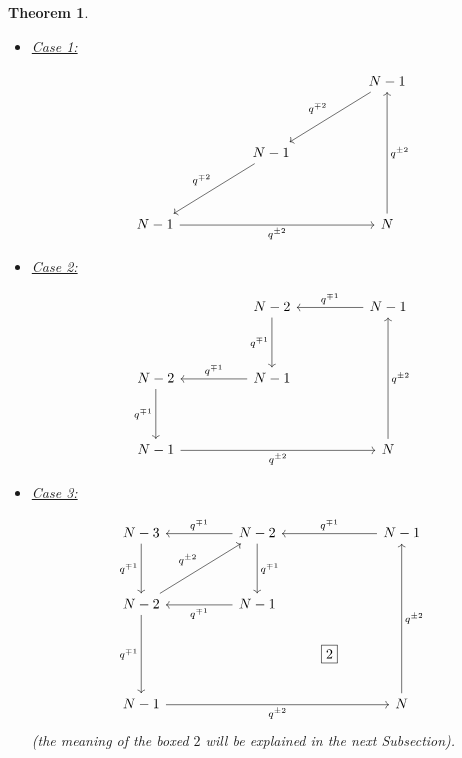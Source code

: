 \documentclass{amsart}
\newtheorem{theorem}[subsection]{Theorem}
\begin{document}
\begin{theorem}
\medskip 

\begin{itemize}[leftmargin=*]

\item \underline{Case 1:} 

\begin{equation}
\label{eqn:wheel c 1}
\begin{tikzcd}
&&&& N-1 \\ \\
&& N-1 \\ &&&  \\
N-1 &&&& N
\arrow["{q^{\pm 2}}"', from=5-1, to=5-5]
\arrow["{q^{\pm 2}}"', from=5-5, to=1-5]
\arrow["{q^{\mp 2}}"', from=1-5, to=3-3]
\arrow["{q^{\mp 2}}"', from=3-3, to=5-1]
\end{tikzcd}
\end{equation}

\medskip 

\item \underline{Case 2:} 

\begin{equation}
\label{eqn:wheel c 2}
\begin{tikzcd}
&& N-2 && N-1 \\ \\
N-2 && N-1 \\ &&&  \\
N-1 &&&& N
\arrow["{q^{\pm 2}}"', from=5-1, to=5-5]
\arrow["{q^{\pm 2}}"', from=5-5, to=1-5]
\arrow["{q^{\mp 1}}"', from=1-5, to=1-3]
\arrow["{q^{\mp 1}}"', from=1-3, to=3-3]
\arrow["{q^{\mp 1}}"', from=3-3, to=3-1]
\arrow["{q^{\mp 1}}"', from=3-1, to=5-1]
\end{tikzcd}
\end{equation}

\medskip 

\item \underline{Case 3:} 

\begin{equation}
\label{eqn:wheel c 3}
\begin{tikzcd}
N-3 && N-2 && N-1 \\ \\
N-2 && N-1 \\ &&& \boxed{2} \\
N-1 &&&& N
\arrow["{q^{\pm 2}}"', from=5-1, to=5-5]
\arrow["{q^{\pm 2}}"', from=5-5, to=1-5]
\arrow["{q^{\mp 1}}"', from=1-5, to=1-3]
\arrow["{q^{\mp 1}}"', swap, from=1-3, to=3-3]
\arrow["{q^{\mp 1}}"', from=3-1, to=5-1]
\arrow["{q^{\mp 1}}"', from=1-1, to=3-1]
\arrow["{q^{\mp 1}}"', from=1-3, to=1-1]
\arrow["{q^{\mp 1}}"', swap, from=3-3, to=3-1]
\arrow["{q^{\pm 2}}", from=3-1, to=1-3]
\end{tikzcd}
\end{equation}
(the meaning of the boxed $\boxed{2}$ will be explained in the next Subsection).


\end{itemize}
\end{theorem}
\end{document}
